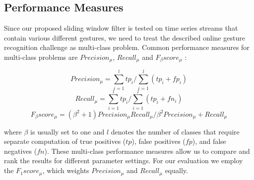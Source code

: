 \subsection{Performance Measures} \label{performance_measures}

Since our proposed sliding window filter is tested on time series streams that contain various different gestures, we need to treat the described online gesture recognition challenge as multi-class problem.
Common performance measures for multi-class problems are $Precision_{\mu}$, $Recall_{\mu}$ and $F_{\beta}score_{\mu}$ \cite{sokolova2009systematic}:

\begin{equation*}
    Precision_{\mu} = {\sum \limits_{i=1}^{l} tp_i}  \bigg/  {\sum \limits_{i=1}^{l} (tp_i + fp_i)}
\end{equation*}
\begin{equation*}
    Recall_{\mu} = {\sum \limits_{i=1}^{l} tp_i} \bigg/{\sum \limits_{i=1}^{l} (tp_i + fn_i)}
\end{equation*}
\begin{equation*}
    F_{\beta}score_{\mu} = {(\beta^2 + 1)Precision_{\mu} Recall_{\mu}} \bigg/ {\beta^2 Precision_{\mu} + Recall_{\mu}}
\end{equation*}

where $\beta$ is usually set to one and $l$ denotes the number of classes that require separate computation of true positives ($tp$), false positives ($fp$), and false negatives ($fn$).
These multi-class performance measures allow us to compare and rank the results for different parameter settings.
For our evaluation we employ the $F_{1}score_{\mu}$, which weights $Precision_{\mu}$ and $Recall_{\mu}$ equally.
